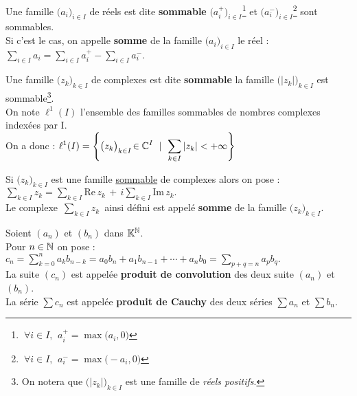 \vspace{1.3cm}

Une famille \(\bigl(a_i\bigr)_{i\in I}\) de réels est dite \textbf{sommable} \ssi \(\bigl(a^+_i\bigr)_{i\in I}\)\footnote{\(\ \forall i\in I,\ \, a^+_i=\max \bigl(a_i, 0\bigr)\)\vspace{0.2cm}} et \(\bigl(a^-_i\bigr)_{i\in I}\)\footnote{\(\ \forall i\in I,\ \, a^-_i=\max \bigl(-a_i, 0\bigr)\)\vspace{0.2cm}} sont sommables.\vspace{0.1cm}\\
Si c'est le cas, on appelle \textbf{somme} de la famille \(\bigl(a_i\bigr)_{i\in I}\) le réel : \(\displaystyle \sum_{i\in I}a_i = \sum_{i\in I}a_i^+ -\sum_{i\in I}a_i^-. \)

\vspace{1.3cm}

Une famille \(\bigl(z_k\bigr)_{k\in I}\) de complexes est dite \textbf{sommable} \ssi la famille \(\bigl(|z_k|\bigr)_{k\in I}\) est sommable\footnote{On notera que \(\bigl(|z_k|\bigr)_{k\in I}\) est une famille de \emph{réels positifs}.\vspace{0.1cm}}.\vspace{0.2cm}\\
On note \(\ell^1(I)\) l'ensemble des familles sommables de nombres complexes indexées par I.\vspace{0.2cm}\\
On a donc : \( \displaystyle \ell^1(I)= \left\{ \bigl( z_k \bigr) _{k\in I}\! \in \mathbb{C}^I \ \mid \ \sum_{k\in I} |z_k| < + \infty \right\} \)

\vspace{1.7cm}

Si \(\bigl(z_k\bigr)_{k\in I}\) est une famille \underline{sommable} de complexes alors on pose : \(\displaystyle \sum_{k\in I}z_k = \sum_{k\in I}\text{Re}\,z_k\, +\, i\sum_{k\in I} \text{Im}\,z_k. \)\\
Le complexe \(\,\displaystyle \sum_{k\in I}z_k\,\) ainsi défini est appelé \textbf{somme} de la famille \(\bigl(z_k\bigr)_{k\in I}\).

\vspace{1.5cm}

Soient \((a_n)\) et \((b_n)\) dans \(\mathbb{K}^{\mathbb{N}}\).\\
Pour \(n\in \mathbb{N}\) on pose : \(\displaystyle c_n=\sum_{k=0}^{n}a_kb_{n-k}=a_0b_n+a_1b_{n-1}+\cdots+a_nb_0=\!\!\sum_{p+q=n}a_pb_q.  \)\vspace{0.1cm}\\
La suite \((c_n)\) est appelée \textbf{produit de convolution} des deux suite \((a_n)\) et \((b_n)\).\\
La série \(\sum c_n\) est appelée \textbf{produit de Cauchy} des deux séries \(\sum a_n\) et \(\sum b_n\).

